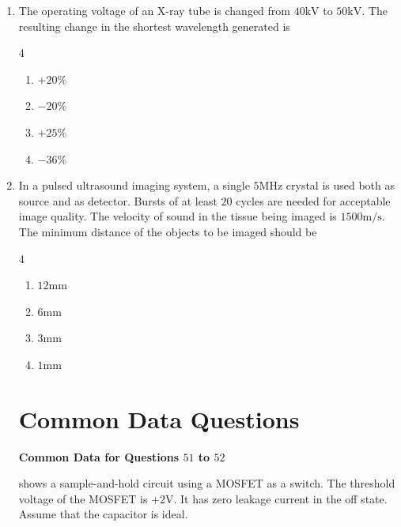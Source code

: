 \documentclass[journal,12pt,onecolumn]{IEEEtran}
\theoremstyle{remark}
\begin{document}
\begin{enumerate}
\vspace{0.5cm}

\item The operating voltage of an X-ray tube is changed from $40\text{kV}$ to $50\text{kV}$. The resulting change in the shortest wavelength generated is \par \hfill{}
\begin{multicols}{4}
    \begin{enumerate}
        \item $+20\%$
        \item $-20\%$
        \item $+25\%$
        \item $-36\%$
\end{enumerate}
\end{multicols}

\vspace{0.5cm}

\item In a pulsed ultrasound imaging system, a single $5\text{MHz}$ crystal is used both as source and as detector. Bursts of at least $20$ cycles are needed for acceptable image quality. The velocity of sound in the tissue being imaged is $1500\text{m/s}$. The minimum distance of the objects to be imaged should be \par \hfill{}
\begin{multicols}{4}
    \begin{enumerate}
        \item $12\text{mm}$
        \item $6\text{mm}$
        \item $3\text{mm}$
        \item $1\text{mm}$
\end{enumerate}
\end{multicols}

\vspace{0.6cm}
\section*{\textbf{Common Data Questions}}
\vspace{0.6cm}

\textbf{Common Data for Questions $51$ to $52$}\par

 shows a sample-and-hold circuit using a MOSFET as a switch. The threshold voltage of the MOSFET is $+2\text{V}$. It has zero leakage current in the off state. Assume that the capacitor is ideal.


\end{enumerate}
\end{document}
